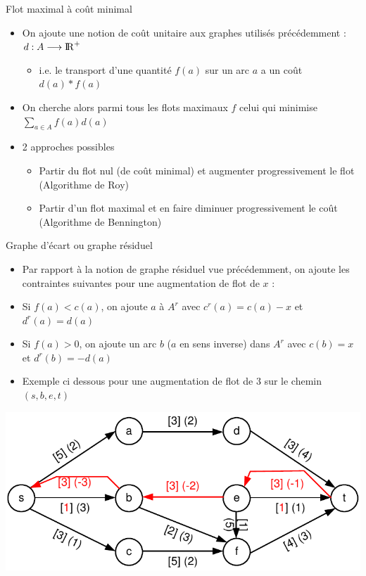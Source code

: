 \begin{frame}{Flot maximal à coût minimal}
    \begin{itemize}
        \item On ajoute une notion de coût unitaire aux graphes utilisés précédemment : $d : A \longrightarrow \mathrm{I\! R}^+$
        \begin{itemize}
            \item i.e. le transport d'une quantité $f(a)$ sur un arc $a$ a un coût $d(a)*f(a)$ 
        \end{itemize}
        \item On cherche alors parmi tous les flots maximaux $f$ celui qui minimise $\sum_{a \in A} f(a)d(a)$
        \item 2 approches possibles 
        \begin{itemize}
            \item Partir du flot nul (de coût minimal) et augmenter progressivement le flot (Algorithme de Roy)
            \item Partir d'un flot maximal et en faire diminuer progressivement le coût (Algorithme de Bennington)
        \end{itemize}
    \end{itemize}
\end{frame}


\begin{frame}{Graphe d'écart ou graphe résiduel}
\begin{itemize}
    \item Par rapport à la notion de graphe résiduel vue précédemment, on ajoute les contraintes suivantes pour une augmentation de flot de $x$ :
    \item Si $f(a) < c(a)$, on ajoute $a$ à $A^r$ avec $c^r(a)=c(a)-x$ et $d^r(a) = d(a)$
    \item Si $f(a) > 0$, on ajoute un arc $b$ ($a$ en sens inverse) dans $A^r$ avec $c(b)=x$ et $d^r(b) = -d(a)$ 
    \item Exemple ci dessous pour une augmentation de flot de 3 sur le chemin $(s,b,e,t)$
\end{itemize}
\begin{center}
    \includegraphics[width=.6\textwidth]{fig/fmcm2.pdf}
\end{center}
\end{frame}


